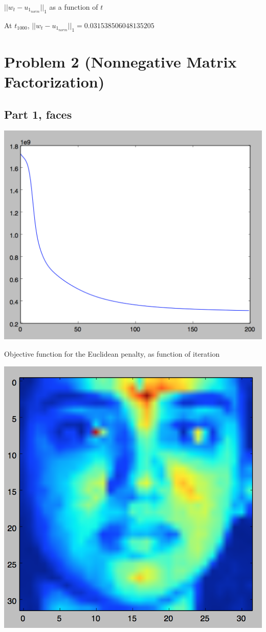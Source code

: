 \documentclass[11pt]{article}
\begin{document}
$||w_t - u_{1_{norm}}||_1$ as a function of $t$

At $t_1000$, $||w_t - u_{1_{norm}}||_1 =  0.031538506048135205$



\section*{Problem 2 (Nonnegative Matrix Factorization)}

\subsection*{Part 1, faces}

\includegraphics[scale=.5]{images/obj_euc}

Objective function for the Euclidean penalty, as function of iteration


\includegraphics[scale=.5]{images/img1}
\end{document}
